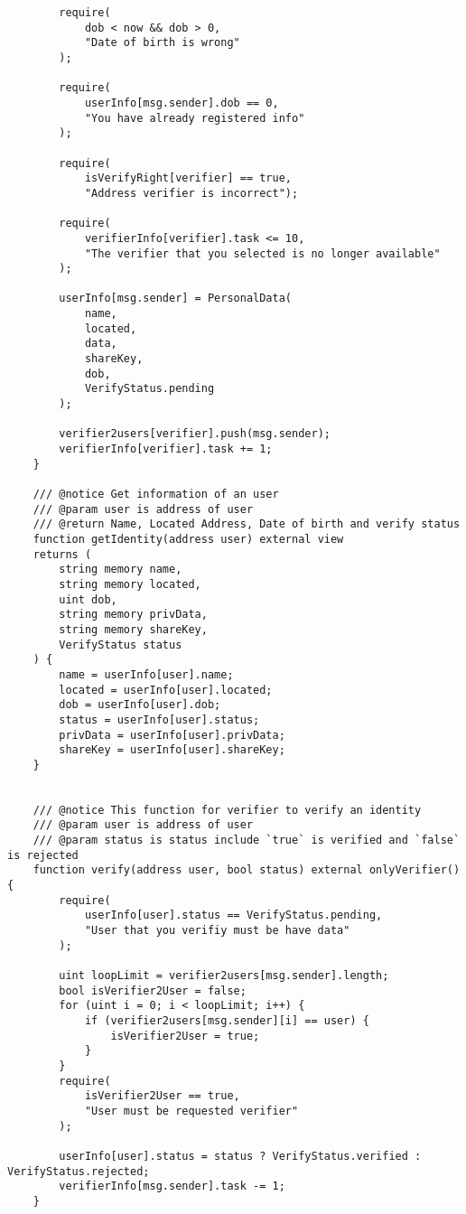\documentclass[../main-report.tex]{subfiles}
\begin{document}
\begin{lstlisting}
        require(
            dob < now && dob > 0,
            "Date of birth is wrong"
        );

        require(
            userInfo[msg.sender].dob == 0,
            "You have already registered info"
        );

        require(
            isVerifyRight[verifier] == true,
            "Address verifier is incorrect");
        
        require(
            verifierInfo[verifier].task <= 10,
            "The verifier that you selected is no longer available"
        );

        userInfo[msg.sender] = PersonalData(
            name,
            located,
            data,
            shareKey,
            dob,
            VerifyStatus.pending
        );
        
        verifier2users[verifier].push(msg.sender);
        verifierInfo[verifier].task += 1;
    }

    /// @notice Get information of an user
    /// @param user is address of user
    /// @return Name, Located Address, Date of birth and verify status
    function getIdentity(address user) external view
    returns (
        string memory name,
        string memory located,
        uint dob,
        string memory privData,
        string memory shareKey,
        VerifyStatus status
    ) {
        name = userInfo[user].name;
        located = userInfo[user].located;
        dob = userInfo[user].dob;
        status = userInfo[user].status;
        privData = userInfo[user].privData;
        shareKey = userInfo[user].shareKey;
    }


    /// @notice This function for verifier to verify an identity
    /// @param user is address of user
    /// @param status is status include `true` is verified and `false` is rejected
    function verify(address user, bool status) external onlyVerifier() {
        require(
            userInfo[user].status == VerifyStatus.pending,
            "User that you verifiy must be have data"
        );

        uint loopLimit = verifier2users[msg.sender].length;
        bool isVerifier2User = false;
        for (uint i = 0; i < loopLimit; i++) {
            if (verifier2users[msg.sender][i] == user) {
                isVerifier2User = true;
            }
        }
        require(
            isVerifier2User == true,
            "User must be requested verifier"
        );

        userInfo[user].status = status ? VerifyStatus.verified : VerifyStatus.rejected;
        verifierInfo[msg.sender].task -= 1;
    }


\end{lstlisting}
\end{document}
